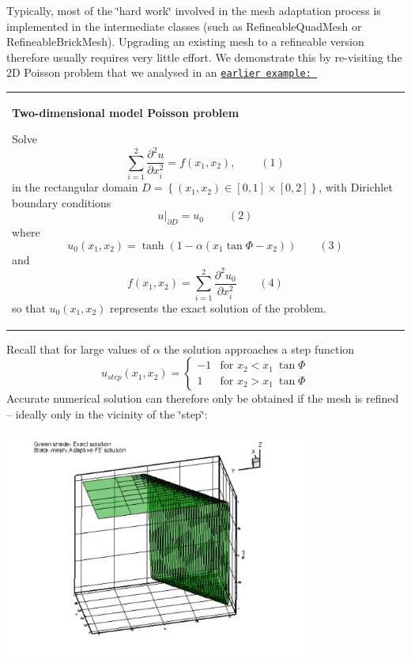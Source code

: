 Typically, most of the \char`\"{}hard work\char`\"{} involved in the mesh adaptation process is implemented in the intermediate classes (such as {\ttfamily Refineable\+Quad\+Mesh} or {\ttfamily Refineable\+Brick\+Mesh}). Upgrading an existing mesh to a refineable version therefore usually requires very little effort. We demonstrate this by re-\/visiting the 2D Poisson problem that we analysed in an \href{../../../poisson/two_d_poisson/html/index.html}{\tt earlier example\+: }

\begin{center} \tabulinesep=1mm
\begin{longtabu} spread 0pt [c]{*{1}{|X[-1]}|}
\hline
\begin{center} {\bfseries Two-\/dimensional model Poisson problem} \end{center}  Solve \[ \sum_{i=1}^2 \frac{\partial^2u}{\partial x_i^2} = f(x_1,x_2), \ \ \ \ \ \ \ \ \ \ (1) \] in the rectangular domain $D =\left\{ (x_1,x_2) \in [0,1] \times [0,2]\right\}$, with Dirichlet boundary conditions \[ \left. u\right|_{\partial D}=u_0 \ \ \ \ \ \ \ \ \ \ (2) \] where \[ u_0(x_1,x_2) = \tanh(1-\alpha(x_1 \tan\Phi - x_2)) \ \ \ \ \ \ \ \ \ (3) \] and \[ f(x_1,x_2) = \sum_{i=1}^2 \frac{\partial^2 u_0}{\partial x_i^2} \ \ \ \ \ \ \ \ \ (4) \] so that $u_0(x_1,x_2) $ represents the exact solution of the problem.   \\
\end{longtabu}
\end{center} 

Recall that for large values of $ \alpha $ the solution approaches a step function \[ u_{step}(x_1,x_2) = \left\{ \begin{array}{rl} -1 & \mbox {for $x_2 < x_1 \ \tan\Phi$} \\ 1 & \mbox {for $x_2 > x_1 \ \tan\Phi$} \end{array} \right. \] Accurate numerical solution can therefore only be obtained if the mesh is refined -- ideally only in the vicinity of the \char`\"{}step\char`\"{}\+:

 
\begin{DoxyImage}
\includegraphics[width=0.75\textwidth]{TanhPoissonAdaptive}
\end{DoxyImage}


